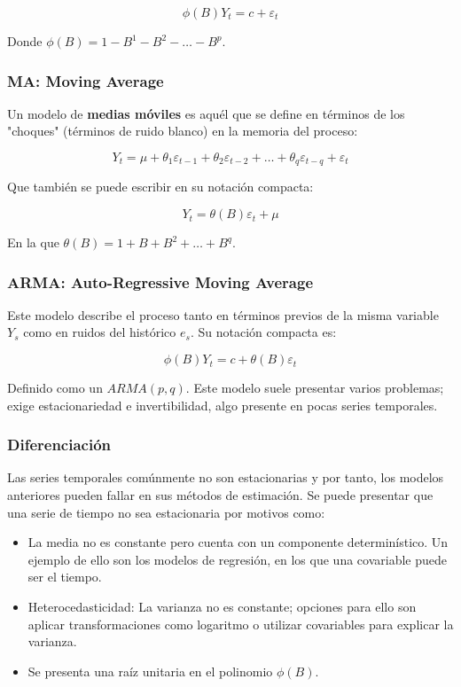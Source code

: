 \documentclass[10pt,twoside,xcolor=table,x11anmes]{IEEEtran}
\begin{document}
$$\phi(B)Y_t = c+\varepsilon_t$$

Donde $\phi(B) = 1 - B^1 - B^2-\dots -B^p$.

\subsubsection{MA: Moving Average}

Un modelo de \textbf{medias móviles} es aquél que se define en términos de los "choques" (términos de ruido blanco) en la memoria del proceso:

$$Y_t = \mu + \theta_{1}\varepsilon_{t-1}+\theta_{2}\varepsilon_{t-2}+\dots+\theta_{q}\varepsilon_{t-q} + \varepsilon_t$$

Que también se puede escribir en su notación compacta:

$$Y_t = \theta(B)\varepsilon_t+\mu$$

En la que $\theta(B)=1 + B + B^2 +\dots+ B^q$.

\subsubsection{ARMA: Auto-Regressive Moving Average}

Este modelo describe el proceso tanto en términos previos de la misma variable $Y_s$ como en ruidos del histórico $e_s$. Su notación compacta es:

$$\phi(B)Y_t = c + \theta(B)\varepsilon_t$$

Definido como un $ARMA(p,q)$. Este modelo suele presentar varios problemas; exige estacionariedad e invertibilidad, algo presente en pocas series temporales. 

\subsubsection{Diferenciación}

Las series temporales comúnmente no son estacionarias y por tanto, los modelos anteriores pueden fallar en sus métodos de estimación. Se puede presentar que una serie de tiempo no sea estacionaria por motivos como:

\begin{itemize}
    \item La media no es constante pero cuenta con un componente determinístico. Un ejemplo de ello son los modelos de regresión, en los que una covariable puede ser el tiempo.
    \item Heterocedasticidad: La varianza no es constante; opciones para ello son aplicar transformaciones como logaritmo o utilizar covariables para explicar la varianza.
    \item Se presenta una raíz unitaria en el polinomio $\phi(B)$.
\end{itemize}
\end{document}
